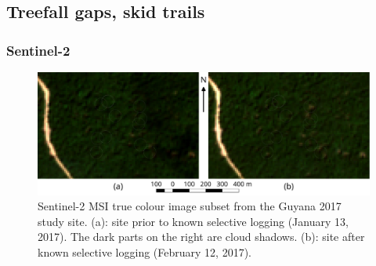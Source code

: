 \documentclass[a4paper,12pt]{scrbook}
\begin{document}
\subsection{Treefall gaps, skid trails}


\subsubsection{Sentinel-2}
\label{sec-treefall-sentinel2}

\begin{figure}
  \centering
  \includegraphics[width=\textwidth]{thesis-figures/02-guyana-sentinel2-tci}
  \caption{Sentinel-2 \ac{MSI} true colour image subset from the Guyana 2017 study site. (a): site prior to known selective logging (January 13, 2017). The dark parts on the right are cloud shadows. (b): site after known selective logging (February 12, 2017).}
  \label{fig-guyana-sentinel2-tci}
\end{figure}
\end{document}
